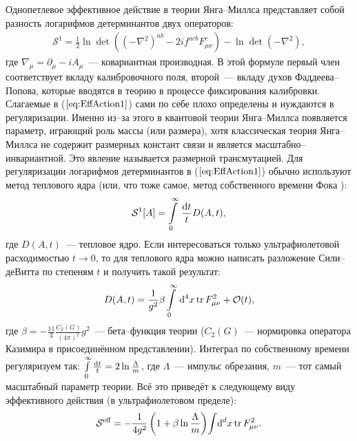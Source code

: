 Однопетлевое эффективное действие в теории Янга--Миллса представляет собой разность логарифмов детерминантов двух операторов:
\begin{align}
	\label{eq:EffAction1}
	\mathcal{S}^{1}=\frac 12 \ln\det\left((-\nabla^2)^{ab} - 2if^{acb}F^c_{\mu \nu}\right) - \ln\det\left(-\nabla^2\right),
\end{align}
где $\nabla_\mu=\partial_\mu-iA_\mu$~--- ковариантная производная. В этой формуле первый член соответствует вкладу калибровочного поля, второй~--- вкладу духов Фаддеева--Попова, которые вводятся в теорию в процессе фиксирования калибровки. Слагаемые в ($\ref{eq:EffAction1}$) сами по себе плохо определены и нуждаются в регуляризации. Именно из--за этого в квантовой теории Янга--Миллса появляется параметр, играющий роль массы (или размера), хотя классическая теория Янга--Миллса не содержит размерных констант связи и является масштабно--инвариантной. Это явление называется размерной трансмутацией. Для регуляризации логарифмов детерминантов в ($\ref{eq:EffAction1}$) обычно используют метод теплового ядра \cite{Faddeev2014} (или, что тоже самое, метод собственного времени Фока \cite{Fock}):
\begin{equation*}
	\mathcal{S}^1[A]=\int\limits_0^{\infty}\,\frac{\mathrm{d} t}{t}D(A,t),
\end{equation*}
где $D(A,t)$~--- тепловое ядро. Если интересоваться только ультрафиолетовой расходимостью $t\to 0$, то для теплового ядра можно написать разложение Сили--деВитта по степеням $t$ и получить такой результат:
\begin{equation*}
	D(A,t)=\frac{1}{g^2}\beta \int\limits_0^\infty \, \mathrm{d}^4 x\, \mathrm{tr}\,F_{\mu \nu}^2+\mathcal{O}(t),
\end{equation*}
где $\beta=-\frac{11}{3}\frac{C_2(G)}{(4\pi)^2}g^2$~--- бета--функция теории ($C_2(G)$~--- нормировка оператора Казимира в присоединённом представлении). Интеграл по собственному времени регуляризуем так: $\int\limits_0^\infty\frac{\mathrm{d} t}{t}=2\ln{\frac{\Lambda}{m}}$, где $\Lambda$~--- импульс обрезания, $m$~--- тот самый масштабный параметр теории. Всё это приведёт к следующему виду эффективного действия (в ультрафиолетовом пределе):
\begin{equation}
	\mathcal{S}^\text{eff}=-\frac{1}{4g^2}\left(1+\beta\ln{\frac{\Lambda}{m}}\right)\!\int\!\mathrm{d}^dx\, \mathrm{tr}\,F^2_{\mu \nu}.
\end{equation}

